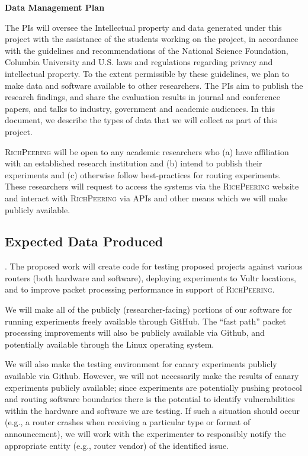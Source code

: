 \documentclass[11pt]{article}
\newcommand{\sys}{{\textsc{RichPeering }\xspace}}
\newcommand{\parai}[1]{\smallskip\noindent{\textit {#1}}}
\begin{document}
\begin{center}
{\LARGE \textbf{Data Management Plan}}
\end{center}

\bigskip
\par

The PIs will oversee the Intellectual property and data generated under this project with the assistance of the students working on the project, in accordance with the guidelines and recommendations of the National Science Foundation, Columbia University and U.S. laws and regulations regarding privacy and intellectual property.
To the extent permissible by these guidelines, we plan to make data and software available to other researchers. The PIs aim to publish the research findings, and share the evaluation results in journal and conference papers, and talks to industry, government and academic audiences. In this document, we describe the types of data that we will collect as part of this project. 

\sys will be open to any academic researchers  who (a) have affiliation with an established research institution and (b) intend to publish their experiments and (c) otherwise follow best-practices for routing experiments. These researchers will request to access the systems via the \sys website and interact with \sys via APIs and other means which we will make publicly available.  

\subsection*{Expected Data Produced}


\parai{Software and code}.  The proposed work will create code for testing proposed projects against various routers (both hardware and software), deploying experiments to Vultr locations, and to improve packet processing performance in support of \textsc{RichPeering}.  

We will make all of the  publicly (researcher-facing) portions of our software for running experiments freely available through GitHub.  The ``fast path'' packet processing improvements will also be publicly available via Github, and potentially available through the Linux operating system.

We will also make the testing environment for canary experiments publicly available via Github.  However, we will not necessarily make the results of canary experiments publicly available; since experiments are potentially pushing protocol and routing software boundaries there is the potential to identify vulnerabilities within the hardware and software we are testing.  If such a situation should occur (e.g., a router crashes when receiving a particular type or format of announcement), we will work with the experimenter to responsibly notify the appropriate entity (e.g., router vendor) of the identified issue.
\end{document}
